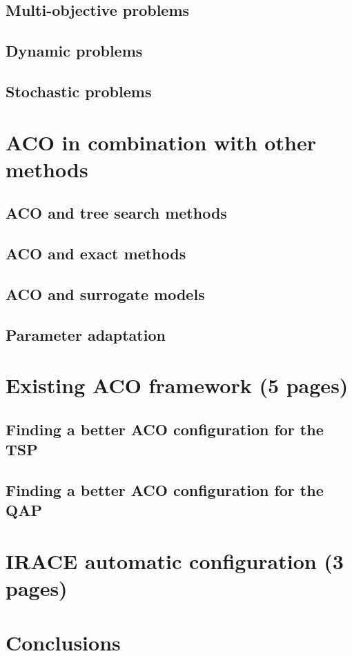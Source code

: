 \documentclass[12pt]{article}
\begin{document}
\subsection{Multi-objective problems}

\subsection{Dynamic problems}

\subsection{Stochastic problems}

\section{ACO in combination with other methods}

\subsection{ACO and tree search methods}

\subsection{ACO and exact methods}

\subsection{ACO and surrogate models}

\subsection{Parameter adaptation}

\section{Existing ACO framework (5 pages)}

\subsection{Finding a better ACO configuration for the TSP}

\subsection{Finding a better ACO configuration for the QAP}

\section{IRACE automatic configuration (3 pages)}

\section{Conclusions}

\begin{thebibliography}{1}

\end{thebibliography}
\end{document}
